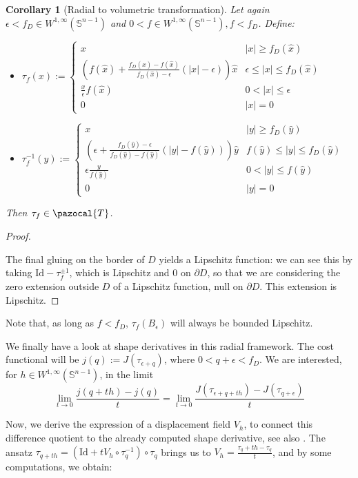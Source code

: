 \documentclass[english,a4paper,9pt,oneside]{scrbook}	%
\theoremstyle{break}
\newtheorem{cor}[equation]{Corollary}
\newenvironment{mproof}[1][\proofname]{%
  \begin{proof}[#1]$ $\par\nobreak\ignorespaces
}{%
  \end{proof}
}
\renewcommand*{\proofname}{Proof}
\theoremstyle{remark}
\newcommand{\mS}{\mathbb{S}^{n-1}}
\newcommand{\ds}{\displaystyle}
\newcommand{\cT}{\pazocal{T}}
\newcommand{\id}{\text{Id}}
\newcommand{\xh}{\hat{x}}
\newcommand{\yh}{\hat{y}}
\newcommand{\eps}{\epsilon}
\begin{document}
\begin{cor}[Radial to volumetric transformation]
\label{cor:star_shaped_transformation}
Let again $\eps <f_D \in W^{1,\infty}(\mS)$ and $0<f \in W^{1,\infty}(\mS), f<f_D$. Define:

\begin{itemize}
	\item $\ds \tau_f(x):=\left\{\begin{matrix}
 x & |x|\geq f_D(\xh)\\ 
 \left (  f(\xh)+\frac{f_D(\xh)-f(\xh)}{f_D(\xh)-\eps}(|x|-\eps) \right )\xh & \eps \leq |x| \leq f_D(\xh) \\ 
 \frac{x}{\epsilon}f(\hat{x}) & 0<|x|\leq \eps\\ 
 0 & |x|=0
\end{matrix}\right.$

	\item $\ds \tau_f^{-1}(y):=\left\{\begin{matrix}
 x & |y|\geq f_D(\yh)\\ 
 \left (  \eps+\frac{f_D(\yh)-\eps}{f_D(\yh)-f(\yh)}(|y|-f(\yh)) \right )\yh & f(\yh) \leq |y| \leq f_D(\yh) \\ 
 \epsilon \frac{y}{f(\hat{y})}& 0<|y|\leq f(\yh)\\ 
 0 & |y|=0
\end{matrix}\right.$
\end{itemize}


Then $\tau_f \in \cT$.
\end{cor}
\begin{mproof}

The final gluing on the border of $D$ yields a Lipschitz function: we can see this by taking $\id -\tau_f^{\pm 1}$, which is Lipschitz and $0$ on $\partial D$, so that we are considering the zero extension outside $D$ of a Lipschitz function, null on $\partial D$. This extension is Lipschitz.
\end{mproof}

Note that, as long as $f<f_D$, $\tau_f(B_\eps)$ will always be bounded Lipschitz.

We finally have a look at shape derivatives in this radial framework. The cost functional will be $j(q):=J(\tau_{\eps+q})$, where $0<q+\eps < f_D$. We are interested, for $h\in W^{1, \infty}(\mS)$, in the limit $$\lim_{t\rightarrow 0}\frac{j(q+th)-j(q)}{t}=\lim_{t\rightarrow 0}\frac{J(\tau_{\eps+q+th})-J(\tau_{q+\eps})}{t}$$

Now, we derive the expression of a displacement field $V_h$, to connect this difference quotient to the already computed shape derivative, see also \cite{deckelnick}. The ansatz $\tau_{q+th}=(\id + tV_h\circ \tau_q^{-1})\circ \tau_q$ brings us to $V_h = \ds \frac{\tau_q+th-\tau_q}{t}$, and by some computations, we obtain: 
\end{document}
